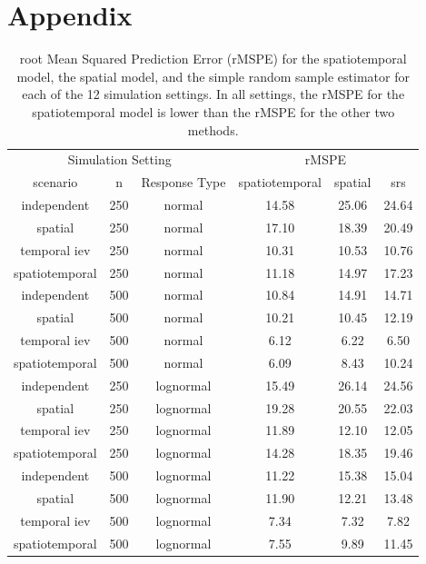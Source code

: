 \documentclass[]{interact}
\theoremstyle{plain}%
\theoremstyle{definition}
\theoremstyle{remark}
\begin{document}
\section{Appendix} \label{section:appendix}

\begin{table}[H]

\caption{\label{tab:simrmspetab}root Mean Squared Prediction Error (rMSPE) for the spatiotemporal model, the spatial model, and the simple random sample estimator for each of the 12 simulation settings. In all settings, the rMSPE for the spatiotemporal model is lower than the rMSPE for the other two methods.}
\centering
\begin{tabular}[t]{cccccc}
\toprule
\multicolumn{3}{c}{Simulation Setting} & \multicolumn{3}{c}{rMSPE} \\
\cmidrule(l{3pt}r{3pt}){1-3} \cmidrule(l{3pt}r{3pt}){4-6}
scenario & n & Response Type & spatiotemporal & spatial & srs\\
\midrule
independent & 250 & normal & 14.58 & 25.06 & 24.64\\
spatial & 250 & normal & 17.10 & 18.39 & 20.49\\
temporal iev & 250 & normal & 10.31 & 10.53 & 10.76\\
spatiotemporal & 250 & normal & 11.18 & 14.97 & 17.23\\
\midrule
independent & 500 & normal & 10.84 & 14.91 & 14.71\\
spatial & 500 & normal & 10.21 & 10.45 & 12.19\\
temporal iev & 500 & normal & 6.12 & 6.22 & 6.50\\
spatiotemporal & 500 & normal & 6.09 & 8.43 & 10.24\\
\midrule
independent & 250 & lognormal & 15.49 & 26.14 & 24.56\\
spatial & 250 & lognormal & 19.28 & 20.55 & 22.03\\
temporal iev & 250 & lognormal & 11.89 & 12.10 & 12.05\\
spatiotemporal & 250 & lognormal & 14.28 & 18.35 & 19.46\\
\midrule
independent & 500 & lognormal & 11.22 & 15.38 & 15.04\\
spatial & 500 & lognormal & 11.90 & 12.21 & 13.48\\
temporal iev & 500 & lognormal & 7.34 & 7.32 & 7.82\\
spatiotemporal & 500 & lognormal & 7.55 & 9.89 & 11.45\\
\bottomrule
\end{tabular}
\end{table}
\end{document}
